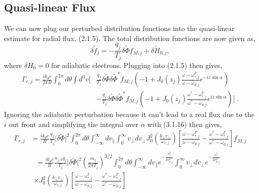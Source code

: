 \documentclass[12pt]{article}
\numberwithin{equation}{subsection}
\begin{document}
\subsection{Quasi-linear Flux}
   \quad We can now plug our perturbed distribution functions into the quasi-linear estimate for radial flux, (2.1.5). The total
distribution functions are now given as,
   \begin{equation}
      \delta \widetilde{f}_j = -\frac{q_j}{T_j}\delta\widetilde{\Phi}f_{M,j} + \delta\widetilde{H}_{0,j},
   \end{equation}
where $\delta H_0 = 0$ for adiabatic electrons. Plugging into (2.1.5) then gives,
   \begin{equation}
   \begin{aligned}
      \Gamma_{r,j} = \frac{ik_\theta c}{2\pi B}\int_{0}^{2\pi}d\theta\int d^3v
            [&\frac{q_j}{T_j}\delta\widetilde{\Phi}\delta\widetilde{\Phi}^*f_{M,j}(-1+J_0(z_j)\frac{\omega-\omega^T_{*,j}}{\omega-\bar{\omega}_{d,j}}e^{-iz\sin\alpha}) \\
             & - \frac{q_j}{T_j}\delta\widetilde{\Phi}\delta\widetilde{\Phi}^*f_{M,j}(-1+J_0(z_j)\frac{\omega^*-\omega^T_{*,j}}{\omega^*-\bar{\omega}_{d,j}}e^{iz\sin\alpha})]\;.
   \end{aligned}
   \end{equation}
Ignoring the adiabatic perturbation because it can't lead to a real flux due to the $i$ out front and simplifying the integral over $\alpha$ with
(3.1.16) then gives,
   \begin{equation}
   \begin{aligned}
      \Gamma_{r,j} &= \frac{ik_\theta c}{B}\frac{q_j}{T_j}\lvert\delta\widetilde{\Phi}\rvert^2\int_{0}^{2\pi}d\theta\int_{-\infty}^{\infty}dv_\parallel
                      \int_{0}^{\infty}v_\perp dv_\perp J_0^2(\frac{k_\perp v_\perp}{\omega_{c,j}})
                      [\frac{\omega-\omega^T_{*,j}}{\omega-\bar{\omega}_{d,j}} - \frac{\omega^*-\omega^T_{*,j}}{\omega^*-\bar{\omega}_{d,j}}]f_{M,j} \\
                   & 
                      \begin{aligned} \;=
                      \frac{ik_\theta c}{B}\frac{n_{j,0}q_j}{T_j}\lvert\delta\widetilde{\Phi}\rvert^2\left(\frac{m_j}{2\pi T_j}\right)^{3/2}
                      \int_{0}^{2\pi}d\theta\int_{-\infty}^{\infty}dv_\parallel e^{-\frac{v_\parallel^2}{2v_{T,j}^2}}
                      \int_{0}^{\infty}v_\perp dv_\perp e^{-\frac{v_\perp^2}{2v_{T,j}^2}} \\
                      \times J_0^2(\frac{k_\perp v_\perp}{\omega_{c,j}})
                      [\frac{\omega-\omega^T_{*,j}}{\omega-\bar{\omega}_{d,j}}
                       - \frac{\omega^*-\omega^T_{*,j}}{\omega^*-\bar{\omega}_{d,j}}]
                      \end{aligned}
   \end{aligned}
   \end{equation}
\end{document}
